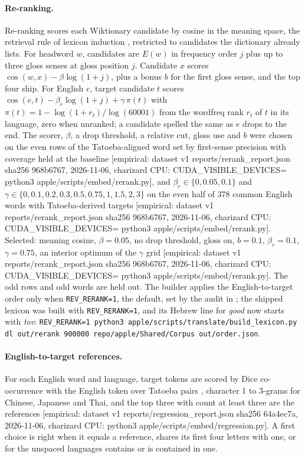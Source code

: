 \documentclass[11pt]{article}
\newcommand{\tg}[1]{\textcolor{bucketgray}{\footnotesize #1}}
\begin{document}
\paragraph{Re-ranking.} Re-ranking scores each Wiktionary candidate by cosine in the meaning space, the retrieval rule of lexicon induction \cite{conneau2017muse,glavas2019evaluate}, restricted to candidates the dictionary already lists. For headword $w$, candidates are $E(w)$ in frequency order $j$ plus up to three gloss senses at gloss position $j$. Candidate $x$ scores $\cos(w,x) - \beta \log(1+j)$, plus a bonus $b$ for the first gloss sense, and the top four ship. For English $e$, target candidate $t$ scores $\cos(e,t) - \beta_r \log(1+j) + \gamma\,\pi(t)$ with $\pi(t)=1-\log(1+r_t)/\log(60001)$ from the wordfreq rank $r_t$ of $t$ in its language, zero when unranked; a candidate spelled the same as $e$ drops to the end. The scorer, $\beta$, a drop threshold, a relative cut, gloss use and $b$ were chosen on the even rows of the Tatoeba-aligned word set by first-sense precision with coverage held at the baseline \tg{[empirical: dataset v1 reports/rerank\_report.json sha256 968b6767, 2026-11-06, charizard CPU: CUDA\_VISIBLE\_DEVICES= python3 apple/scripts/embed/rerank.py]}, and $\beta_r\in\{0,0.05,0.1\}$ and $\gamma\in\{0,0.1,0.2,0.3,0.5,0.75,1,1.5,2,3\}$ on the even half of 378 common English words with Tatoeba-derived targets \tg{[empirical: dataset v1 reports/rerank\_report.json sha256 968b6767, 2026-11-06, charizard CPU: CUDA\_VISIBLE\_DEVICES= python3 apple/scripts/embed/rerank.py]}. Selected: meaning cosine, $\beta=0.05$, no drop threshold, gloss on, $b=0.1$, $\beta_r=0.1$, $\gamma=0.75$, an interior optimum of the $\gamma$ grid \tg{[empirical: dataset v1 reports/rerank\_report.json sha256 968b6767, 2026-11-06, charizard CPU: CUDA\_VISIBLE\_DEVICES= python3 apple/scripts/embed/rerank.py]}. The odd rows and odd words are held out. The builder applies the English-to-target order only when \texttt{REV\_RERANK=1}, the default, set by the audit in ; the shipped lexicon was built with \texttt{REV\_RERANK=1}, and its Hebrew line for \emph{good} now starts with \emph{tov}: \texttt{REV\_RERANK=1 python3 apple/scripts/translate/build\_lexicon.py dl out/rerank 900000 repo/apple/Shared/Corpus out/order.json}.

\paragraph{English-to-target references.} For each English word and language, target tokens are scored by Dice co-occurrence \cite{dice1945measures} with the English token over Tatoeba pairs \cite{tiedemann2020tatoeba}, character 1 to 3-grams for Chinese, Japanese and Thai, and the top three with count at least three are the references \tg{[empirical: dataset v1 reports/regression\_report.json sha256 64a4ec7a, 2026-11-06, charizard CPU: python3 apple/scripts/embed/regression.py]}. A first choice is right when it equals a reference, shares its first four letters with one, or for the unspaced languages contains or is contained in one.
\end{document}
